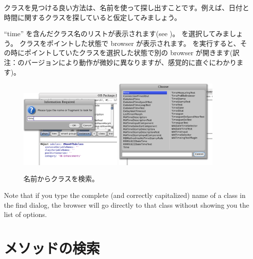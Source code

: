 \documentclass[a4paper,10pt,twoside]{book}
\begin{document}
クラスを見つける良い方法は、名前を使って探し出すことです。例えば、日付と時間に関するクラスを探していると仮定してみましょう。

\noindent
``time'' を含んだクラス名のリストが表示されます(see )。 を選択してみましょう。 クラスをポイントした状態で browser が表示されます。 を実行すると、その時にポイントしていたクラスを選択した状態で別の browser が開きます(訳注：\pharo のバージョンにより動作が微妙に異なりますが、感覚的に直ぐにわかります)。

\begin{figure}[hbt]
\centerline{
	\includegraphics[width=0.45\textwidth]{FindIt}
	\hspace{1cm}
	\includegraphics[width=0.45\textwidth]{TimeClasses}
}
\caption{名前からクラスを検索。
}
\end{figure}

Note that if you type the complete (and correctly capitalized) name of a class in the find dialog, the browser will go directly to that class without showing you the list of options.

\section{メソッドの検索}
\end{document}
